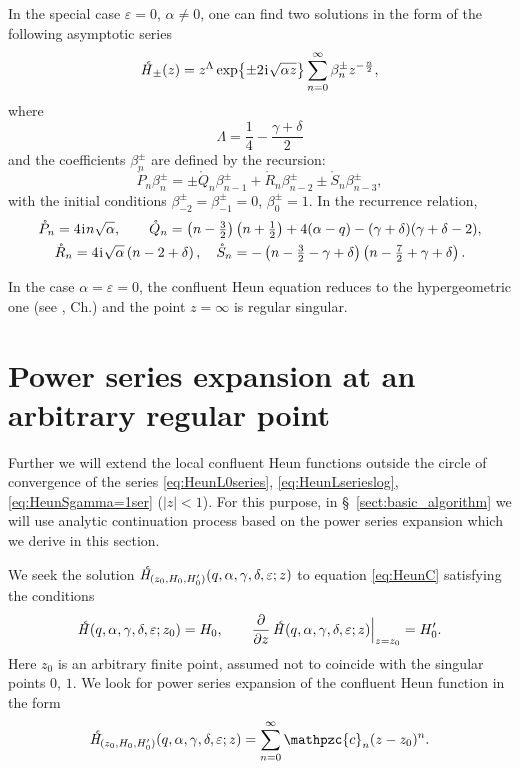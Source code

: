 \documentclass[11pt]{article}
\newcommand{\MF}[1]{\mathop{#1}\nolimits}
\newcommand{\ii}{\kern0.05em\mathrm{i}\kern0.05em} \newcommand{\E}[1]{\textrm{e}^{#1}}
\def\car{\mathpzc{c}}
\def\HeunC{\displaystyle\setbox0=\hbox{\tiny\itshape\bfseries \kern1.52mm c}\wd0=0pt\ht0=0pt\dp0=0pt\MF{\textit{\hbox{\raise1.67ex\copy0}H\/}}}%
\begin{document}
In the special case $\varepsilon=0$, $\alpha\neq0$, one can find two solutions in the form of the following asymptotic series
\begin{equation*}
\HeunC_\pm(z)=z^\Lambda\exp\bigl\{\pm 2\ii \sqrt{\alpha z}\bigr\}\sum_{n=0}^{\infty}\beta^\pm_n z^{-\frac{n}{2}},
\label{eq:infeps0}
\end{equation*}
where
\[
\Lambda=\frac14-\frac{\gamma+\delta}{2}
\]
and the coefficients $\beta^\pm_n$ are defined by the recursion:
\begin{equation*}
\mathring{P}_n\beta^\pm_n=\pm\mathring{Q}_n \beta^\pm_{n-1}+
\mathring{R}_n \beta^\pm_{n-2}\pm\mathring{S}_n \beta^\pm_{n-3},
\label{eq:infeps0rec}
\end{equation*}
with the initial conditions $\beta^\pm_{-2}=\beta^\pm_{-1}=0$, $\beta^\pm_{0}=1$. 
In the recurrence relation,
\begin{gather*}
\mathring{P}_n=4\ii n\sqrt{\alpha},\qquad
\mathring{Q}_n=\left(n-\tfrac32\right)\left(n+\tfrac12\right)+4(\alpha-q)-(\gamma+\delta)(\gamma+\delta-2),\\
\mathring{R}_n=4\ii\sqrt{\alpha}\left(n-2+\delta\right),\quad
\mathring{S}_n= -\left(n-\tfrac32-\gamma+\delta\right)\left(n-\tfrac72+\gamma+\delta\right).
\end{gather*}
 
 
In the case $\alpha=\varepsilon=0$, the confluent Heun equation reduces to the hypergeometric one (see \cite{Erdelyi1955}, Ch.) and the point $z=\infty$ is regular singular. 

\section{Power series expansion at an arbitrary regular point}
\label{sect:expatarbpt}

Further we will extend the local confluent Heun functions outside the circle of
convergence of the series \eqref{eq:HeunL0series}, \eqref{eq:HeunLserieslog},
\eqref{eq:HeunSgamma=1ser} ($|z|<1$). For this purpose, in \S~\ref{sect:basic_algorithm} we will use analytic continuation process based on the power series expansion which we derive in this section.

We seek the solution $\HeunC_{\!(z_0,H_0,H'_0)}(q,\alpha,\gamma,\delta,\varepsilon;z)$
to equation \eqref{eq:HeunC} satisfying the conditions
\begin{equation}
 \HeunC(q,\alpha,\gamma,\delta,\varepsilon;z_0)=H_0,\qquad
 \frac{\partial}{\partial z}\HeunC(q,\alpha,\gamma,\delta,\varepsilon;z)\Bigr|_{z=z_0}=H'_0.
\label{eq:z0H0H'0}
\end{equation}
Here $z_0$ is an arbitrary finite point, assumed not to coincide with the singular points
$0$, $1$. We look for power series expansion of the confluent Heun function in
the form
\begin{equation}
\HeunC_{\!(z_0,H_0,H'_0)}(q,\alpha,\gamma,\delta,\varepsilon;z)=\sum_{n=0}^{\infty}\car_n(z-z_0)^n.
\label{eq:HeunZ0series}
\end{equation}
\end{document}
